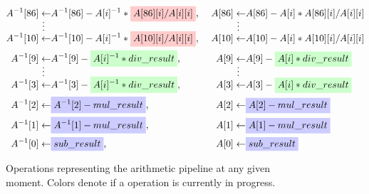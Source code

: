 \newcommand{\twodots}{\MTFlushSpaceAbove\vdotswithin{\gets}&&\vdotswithin{\gets}\MTFlushSpaceBelow}
\begin{figure}[h!]
\begin{align*}
A^{-1}[86]\gets&A^{-1}[86]-A[i]^{-1}*\hr{A[86][i]/A[i][i]},\ 
&A[86]\gets&A[86]-A[i]*A[86][i]/A[i][i]\\
\twodots
A^{-1}[10]\gets&A^{-1}[10]-A[i]^{-1}*\hr{A[10][i]/A[i][i]},\ 
&A[10]\gets&A[10]-A[i]*A[10][i]/A[i][i]\\
A^{-1}[9]\gets&A^{-1}[9]-\hg{A[i]^{-1}*div\_result},\ 
&A[9]\gets&A[9]-\hg{A[i]*div\_result}\\
\twodots
A^{-1}[3]\gets&A^{-1}[3]-\hg{A[i]^{-1}*div\_result},\ 
&A[3]\gets&A[3]-\hg{A[i]*div\_result}\\
A^{-1}[2]\gets&\hb{A^{-1}[2]-mul\_result},\ 
&A[2]\gets&\hb{A[2]-mul\_result}\\
A^{-1}[1]\gets&\hb{A^{-1}[1]-mul\_result},\ 
&A[1]\gets&\hb{A[1]-mul\_result}\\
A^{-1}[0]\gets&\hb{sub\_result},\ 
&A[0]\gets&\hb{sub\_result}
\end{align*}
\caption[Arithmetic pipeline]{Operations representing the arithmetic pipeline at any given moment. Colors denote if a operation is currently in progress.}
\label{pip_pop}
\end{figure}

